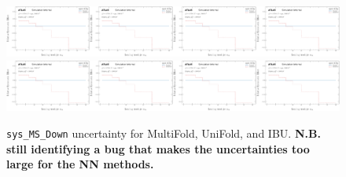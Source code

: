 \begin{figure}[h!]
\includegraphics[width=0.25\textwidth,page=132]{figures/SimResults/Lepton_SystEffect.pdf}\includegraphics[width=0.25\textwidth,page=140]{figures/SimResults/Lepton_SystEffect.pdf}\includegraphics[width=0.25\textwidth,page=148]{figures/SimResults/Lepton_SystEffect.pdf}\includegraphics[width=0.25\textwidth,page=156]{figures/SimResults/Lepton_SystEffect.pdf}\\
\includegraphics[width=0.25\textwidth,page=164]{figures/SimResults/Lepton_SystEffect.pdf}\includegraphics[width=0.25\textwidth,page=172]{figures/SimResults/Lepton_SystEffect.pdf}\includegraphics[width=0.25\textwidth,page=180]{figures/SimResults/Lepton_SystEffect.pdf}\includegraphics[width=0.25\textwidth,page=188]{figures/SimResults/Lepton_SystEffect.pdf}
\caption{\texttt{sys\_MS\_Down} uncertainty for MultiFold, UniFold, and IBU.  \textbf{N.B. still identifying a bug that makes the uncertainties too large for the NN methods.}}
\label{fig:simresultsmulti_Leptonuncertsl4}
\end{figure}

